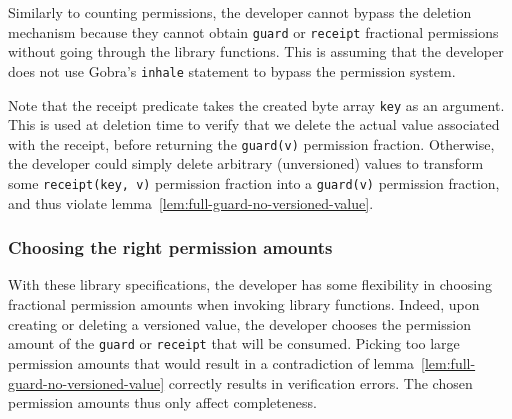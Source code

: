 Similarly to counting permissions, the developer cannot bypass the deletion mechanism because they cannot obtain \texttt{guard} or \texttt{receipt} fractional permissions without going through the library functions.
This is assuming that the developer does not use Gobra's \texttt{inhale} statement to bypass the permission system.

Note that the receipt predicate takes the created byte array \texttt{key} as an argument.
This is used at deletion time to verify that we delete the actual value associated with the receipt, before returning the \texttt{guard(v)} permission fraction. Otherwise, the developer could simply delete arbitrary (unversioned) values to transform some \texttt{receipt(key, v)} permission fraction into a \texttt{guard(v)} permission fraction, and thus violate lemma~\ref{lem:full-guard-no-versioned-value}. %




\subsubsection{Choosing the right permission amounts}
\label{sec:choosing-the-right-permission-amounts}

With these library specifications, the developer has some flexibility in choosing fractional permission amounts when invoking library functions.
Indeed, upon creating or deleting a versioned value, the developer chooses the permission amount of the \texttt{guard} or \texttt{receipt} that will be consumed.
Picking too large permission amounts that would result in a contradiction of lemma~\ref{lem:full-guard-no-versioned-value} correctly results in verification errors.
The chosen permission amounts thus only affect completeness.


